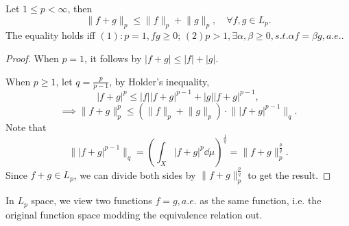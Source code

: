 \begin{theorem}
    Let $1\le p < \infty$, then
	\[
	\lVert f + g \rVert _p \le \lVert f \rVert _p + \lVert g \rVert _p,
	\quad \forall f,g \in L_p.
	\]
	The equality holds iff $(1): p=1, fg\ge 0$;
	$(2) p>1, \exists \alpha,\beta\ge 0, s.t. \alpha f = \beta g,a.e.$.
\end{theorem}
\begin{proof}[Proof]
    When $p = 1$, it follows by $|f+g|\le |f|+|g|$.

	When $p\ge 1$, let $q = \frac{p}{p-1}$, by Holder's inequality,
	\[
	|f+g|^p \le |f||f+g|^{p-1} + |g||f+g|^{p-1},
	\]
	\[
	\implies \lVert f+g \rVert _p^p\le (\lVert f \rVert _p + \lVert g \rVert _p)
	\cdot \lVert |f+g|^{p-1} \rVert _q.
	\]
	Note that
	\[
	\lVert |f+g|^{p-1} \rVert _q = \left(\int_X |f+g|^p\dd \mu\right)^{\frac{1}{q}}
	= \lVert f+g \rVert _p^{\frac{p}{q}}.
	\]
	Since $f+g\in L_p$, we can divide both sides
	by $ \lVert f+g \rVert _p^{\frac{p}{q}}$ to get the result.
\end{proof}

In $L_p$ space, we view two functions $f=g,a.e.$ as the same function,
i.e. the original function space modding the equivalence relation out.
